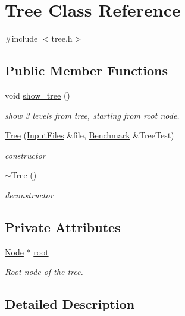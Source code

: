 \hypertarget{class_tree}{}\section{Tree Class Reference}
\label{class_tree}


{\ttfamily \#include $<$tree.\+h$>$}

\subsection*{Public Member Functions}
\begin{DoxyCompactItemize}
\item 
void \hyperlink{class_tree_ac32b48f984b2d1bb4e4ae22316a05eb9}{show\+\_\+tree} ()
\begin{DoxyCompactList}\small\item\em show 3 levels from tree, starting from root node. \end{DoxyCompactList}\item 
\hyperlink{class_tree_a567c6c7e5542e547fdb1957985144a9d}{Tree} (\hyperlink{class_input_files}{Input\+Files} \&file, \hyperlink{class_benchmark}{Benchmark} \&Tree\+Test)
\begin{DoxyCompactList}\small\item\em constructor \end{DoxyCompactList}\item 
\hyperlink{class_tree_abdc38545cf3f588725b5d8b8075b3866}{$\sim$\+Tree} ()
\begin{DoxyCompactList}\small\item\em deconstructor \end{DoxyCompactList}\end{DoxyCompactItemize}
\subsection*{Private Attributes}
\begin{DoxyCompactItemize}
\item 
\hyperlink{class_node}{Node} $\ast$ \hyperlink{class_tree_adea11d0e123823b769f7c3ee9a5a1088}{root}
\begin{DoxyCompactList}\small\item\em Root node of the tree. \end{DoxyCompactList}\end{DoxyCompactItemize}


\subsection{Detailed Description}


